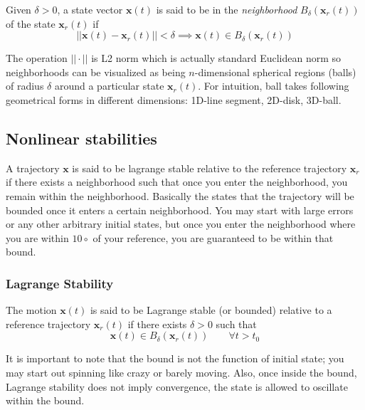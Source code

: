 \documentclass{article}
\begin{document}
Given $\delta>0$, a state vector $\bm{x}(t)$ is said to be in the \textit{neighborhood} $B_{\delta}(\bm{x}_{r}(t))$ of the state $\bm{x}_{r}(t)$ if
$$
|\!|\bm{x}(t)-\bm{x}_{r}(t)|\!|<\delta \implies\bm{x}(t)\in B_{\delta}(\bm{x}_{r}(t))
$$

The operation $|\!|\cdot|\!|$ is L2 norm which is actually standard Euclidean norm so neighborhoods can be visualized as being $n$-dimensional  spherical regions (balls) of radius $\delta$ around a particular state $\bm{x}_{r}(t)$. For intuition, ball takes following geometrical forms in different dimensions: 1D-line segment, 2D-disk, 3D-ball.

\subsection{Nonlinear stabilities}
A trajectory $\bm{x}$ is said to be lagrange stable relative to the reference trajectory $\bm{x}_{r}$ if there exists a neighborhood such that once you enter the neighborhood, you remain within the neighborhood. Basically the states that the trajectory will be bounded once it enters a certain neighborhood. You may start with large errors or any other arbitrary initial states, but once you enter the neighborhood where you are within $10\circ$ of your reference, you are guaranteed to be within that bound. 

\subsubsection*{Lagrange Stability}
The motion $\bm{x}(t)$ is said to be Lagrange stable (or bounded) relative to a reference trajectory $\bm{x}_{r}(t)$ if there exists $\delta>0$ such that
$$
\bm{x}(t)\in B_{\delta}(\bm{x}_{r}(t))\quad\quad\forall t>t_{0}
$$

It is important to note that the bound is not the function of initial state; you may start out spinning like crazy or barely moving. Also, once inside the bound, Lagrange stability does not imply convergence, the state is allowed to oscillate within the bound.
\end{document}
